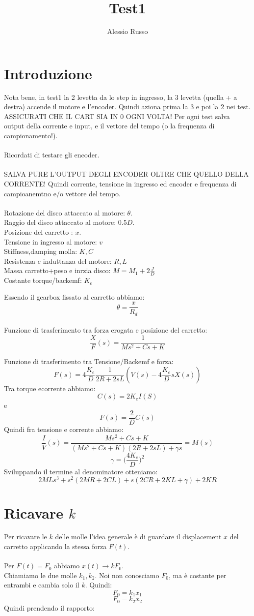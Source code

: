 \documentclass[10pt,a4paper]{article}
\author{Alessio Russo}
\title{Test1}
\begin{document}
\tableofcontents

\section{Introduzione}
Nota bene, in test1 la 2 levetta da lo step in ingresso, la 3 levetta (quella + a destra) accende il motore e l'encoder. Quindi aziona prima la 3 e poi la 2 nei test. ASSICURATI CHE IL CART SIA IN 0 OGNI VOLTA!
Per ogni test salva output della corrente e input, e il vettore del tempo (o la frequenza di campionamento!).  \\
\\ Ricordati di testare gli encoder.
\\ \\
SALVA PURE L'OUTPUT DEGLI ENCODER OLTRE CHE QUELLO DELLA CORRENTE! Quindi corrente, tensione in ingresso ed encoder e frequenza di campioanemtno e/o vettore del tempo.
\\ \\
Rotazione del disco attaccato al motore: $\theta$. \\
Raggio del disco attaccato al motore: $0.5D$. \\
Posizione del carretto : $x$. \\
Tensione in ingresso al motore: $v$ \\
Stiffness,damping molla: $K,C$ \\
Resistenza e induttanza del motore: $R,L$ \\
Massa carretto+peso e inrzia disco: $M=M_1+ 2\frac{J}{D}$ \\
Costante torque/backemf: $K_e$

Essendo il gearbox fissato al carretto abbiamo:
$$\theta= \frac{x}{R_d} $$
\\
Funzione di trasferimento tra forza erogata e posizione del carretto:
$$\frac{X}{F}(s) =  \frac{1}{Ms^2+Cs +K}$$

Funzione di trasferimento tra Tensione/Backemf e forza:
$$F(s) = 4\frac{K_e}{D}\frac{1}{2R+2sL}(V(s)-4\frac{K_e}{D} sX(s))$$
Tra torque ecorrente abbiamo:
$$C(s) = 2K_e I(S)$$
e $$F(s) = \frac{2}{D}C(s)$$
Quindi fra tensione e corrente abbiamo:
$$\frac{I}{V}(s) = \frac{Ms^2+Cs+K}{(Ms^2+Cs+K)(2R+2sL)+\gamma s } =M(s)$$
$$\gamma = \Big(\frac{4K_e}{D}\Big)^2$$
Sviluppando il termine al denominatore otteniamo:
$$2MLs^3 + s^2(2MR+2CL) +s(2CR+2KL+\gamma ) + 2KR$$

\newpage
\section{Ricavare $k$}
Per ricavare le $k$ delle molle l'idea generale è di guardare il displacement $x$ del carretto applicando la stessa forza $F(t)$. \\ \\
Per $F(t)=F_0$ abbiamo $x(t) \to kF_0$. \\
Chiamiamo le due molle $k_1,k_2$. Noi non conosciamo $F_0$, ma è costante per entrambi e cambia solo il $k$. Quindi:
$$F_0 = k_1 x_1$$
$$F_0 = k_2 x_2$$
Quindi prendendo il rapporto:
\end{document}
